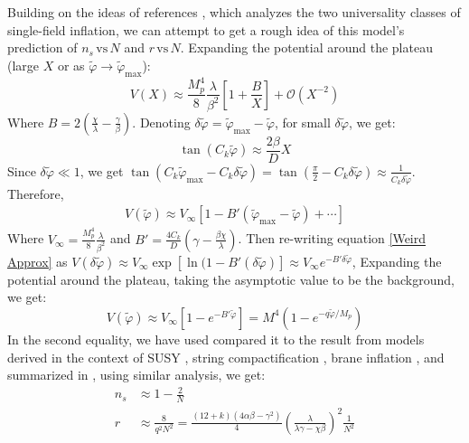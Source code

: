 \documentclass[aps,prd,reprint,preprintnumbers,showpacs,floatfix,nofootinbib,superscript address]{revtex4-2}
\begin{document}
Building on the ideas of references \cite{fairbairn_radion_2003, roest_universality_2014}, which analyzes the two universality classes of single-field inflation, we can attempt to get a rough idea of this model's prediction of $n_s \, \text{vs} \, N$ and $r \, \text{vs} \, N$.
Expanding the potential around the plateau (large $X$ or as $\tilde{\varphi} \rightarrow \tilde{\varphi}_{\text{max}}$):
\begin{equation}
    V(X) \approx \frac{M_p^4}{8} \frac{\lambda}{\beta^2}\left[1 + \frac{B}{X}\right] + \mathcal{O}(X^{-2})
\end{equation}
Where $B = 2(\frac{\chi}{\lambda} - \frac{\gamma}{\beta})$. Denoting $\delta \tilde{\varphi} =  \tilde{\varphi}_{\text{max}} - \tilde{\varphi}$, for small $\delta \tilde{\varphi}$, we get:
\begin{equation}
    \tan(C_k \tilde{\varphi}) \approx \frac{2\beta}{D}X
\end{equation}
Since $\delta \tilde{\varphi} \ll 1$, we get $\tan(C_k \tilde{\varphi}_{\text{max}} - C_k\delta\tilde{\varphi}) = \tan(\frac{\pi}{2} - C_k\delta\tilde{\varphi}) \approx \frac{1}{C_k \delta \tilde{\varphi}}$. Therefore, 
\begin{align} \label{Weird Approx}
    V(\tilde{\varphi}) \approx V_{\infty}[1 - B'(\tilde{\varphi}_{\text{max}} - \tilde{\varphi}) + \cdots]
\end{align}
Where $V_\infty = \frac{M_p^4}{8} \frac{\lambda}{\beta^2}$ and $B' = \frac{4C_k}{D} (\gamma-\frac{\beta\chi}{\lambda})$. Then re-writing equation \ref{Weird Approx} as $V(\delta\tilde{\varphi}) \approx V_{\infty} \exp{[\ln(1 - B'(\delta \tilde{\varphi})]} \approx V_\infty e^{-B'\delta \tilde{\varphi}}$, Expanding the potential around the plateau, taking the asymptotic value to be the background, we get:
\begin{equation}
    V(\tilde{\varphi}) \approx V_\infty [1 - e^{-B' \tilde{\varphi}} ] = M^4 (1 - e^{-q\tilde{\varphi}/M_p})
\end{equation}
In the second equality, we have used compared it to the result from models derived in the context of SUSY \cite{stewart_inflation_1995}, string compactification \cite{cicoli_fibre_2009}, brane inflation \cite{dvali_brane_1999}, and summarized in \cite{martin_encyclopaedia_2014}, using similar analysis, we get:
\begin{align}
    n_s &\approx 1 - \frac{2}{N} \\
    r &\approx \frac{8}{q^2N^2} = \frac{(12+k)(4\alpha\beta - \gamma^2)}{4} \left(\frac{\lambda}{\lambda \gamma - \chi \beta} \right)^2 \frac{1}{N^2} 
\end{align}
\end{document}

